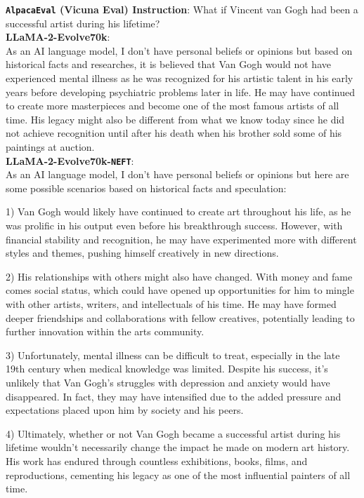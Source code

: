 \documentclass{article} %
\newcommand{\neft}{\texttt{NEFT}}
\newcommand{\llama}{LLaMA}
\begin{document}
\begin{tcolorbox}[breakable,boxrule=0pt]
\textbf{\texttt{AlpacaEval} (Vicuna Eval) Instruction}: What if Vincent van Gogh had been a successful artist during his lifetime? \\
\textbf{\llama{}-2-Evolve70k}:\\
As an AI language model, I don't have personal beliefs or opinions but based on historical facts and researches, it is believed that Van Gogh would not have experienced mental illness as he was recognized for his artistic talent in his early years before developing psychiatric problems later in life. He may have continued to create more masterpieces and become one of the most famous artists of all time. His legacy might also be different from what we know today since he did not achieve recognition until after his death when his brother sold some of his paintings at auction. \\
\textbf{\llama{}-2-Evolve70k-\neft}: \\
As an AI language model, I don't have personal beliefs or opinions but here are some possible scenarios based on historical facts and speculation:

1) Van Gogh would likely have continued to create art throughout his life, as he was prolific in his output even before his breakthrough success. However, with financial stability and recognition, he may have experimented more with different styles and themes, pushing himself creatively in new directions. 

2) His relationships with others might also have changed. With money and fame comes social status, which could have opened up opportunities for him to mingle with other artists, writers, and intellectuals of his time. He may have formed deeper friendships and collaborations with fellow creatives, potentially leading to further innovation within the arts community. 

3) Unfortunately, mental illness can be difficult to treat, especially in the late 19th century when medical knowledge was limited. Despite his success, it's unlikely that Van Gogh's struggles with depression and anxiety would have disappeared. In fact, they may have intensified due to the added pressure and expectations placed upon him by society and his peers. 

4) Ultimately, whether or not Van Gogh became a successful artist during his lifetime wouldn't necessarily change the impact he made on modern art history. His work has endured through countless exhibitions, books, films, and reproductions, cementing his legacy as one of the most influential painters of all time.


\end{tcolorbox}
\end{document}
